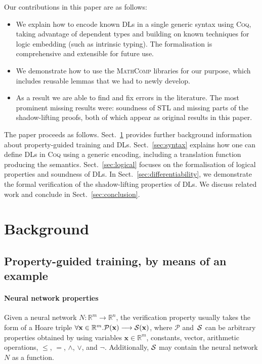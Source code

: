 \documentclass[a4paper,UKenglish,cleveref, autoref, thm-restate]{lipics-v2021}
\newcommand{\Real}{{\mathbb R}}
\newcommand{\Pp}{{\mathcal P}}
\newcommand{\Sp}{{\cal S}}
\def\STL{\textrm{STL}}
\newcommand{\vect}[1]{\mathbf{#1}}
\newcommand{\x}{\vect{x}} %
\def\coq{\textsc{Coq}}
\def\mathcomp{\textsc{MathComp}}
\begin{document}
Our contributions in this paper are as follows:
\begin{itemize}
\item We explain how to encode known DLs in a single generic syntax
  using \coq{}, taking advantage of dependent types and building on
  known techniques for logic embedding (such as intrinsic typing).
  The formalisation is comprehensive and extensible for future use.
\item We demonstrate how to use the \mathcomp{} libraries for our
  purpose, which includes reusable lemmas that we had to newly
  develop.
\item As a result we are able to find and fix errors in the literature.
  The most prominent missing results were: soundness of \STL{} and
  missing parts of the shadow-lifting proofs, both of which appear as
  original results in this paper.
\end{itemize}
 
The paper proceeds as follows.
%
Sect.~\ref{sec:background} provides further background information
about property-guided training and DLs.
%
Sect.~\ref{sec:syntax} explains how one can define DLs in \coq{} using a generic
encoding, including a translation function producing the semantics.
%
Sect.~\ref{sec:logical} focuses on the formalisation of logical
properties and soundness of DLs.
%
In Sect.~\ref{sec:differentiability}, we demonstrate the formal verification of 
the
shadow-lifting properties of DLs.
%
We discuss related work and conclude
in Sect.~\ref{sec:conclusion}.
	
\section{Background}
\label{sec:background}

\subsection{Property-guided training, by means of an example}\label{sec:ex}

\paragraph*{Neural network properties}
Given a neural network $N: \Real^m \to \Real^n$, the verification property 
usually takes the form of a Hoare triple
$\forall \x \in \Real^m . \Pp(\x) \longrightarrow \Sp(\x)$,
 where $\Pp$ and~$\Sp$ can be arbitrary properties 
obtained by using variables $\x \in \Real^m$,
constants, vector, arithmetic operations, $\leq$, $=$, $\land$, $\lor$, and $\neg$. Additionally, 
$\Sp$ may contain the neural network $N$ as a function.
 
\end{document}
